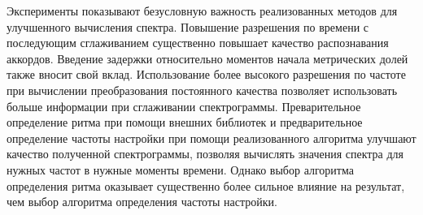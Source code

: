 \medskip

Эксперименты показывают безусловную важность реализованных методов для
улучшенного вычисления спектра. Повышение разрешения по времени с последующим
сглаживанием существенно повышает качество распознавания аккордов. Введение
задержки относительно моментов начала метрических долей также вносит свой вклад.
Использование более высокого разрешения по частоте при вычислении преобразования
постоянного качества позволяет использовать больше информации при сглаживании
спектрограммы. Преварительное определение ритма при помощи внешних библиотек и
предварительное определение частоты настройки при помощи реализованного
алгоритма улучшают качество полученной спектрограммы, позволяя вычислять
значения спектра для нужных частот в нужные моменты времени. Однако выбор
алгоритма определения ритма оказывает существенно более сильное влияние на
результат, чем выбор алгоритма определения частоты настройки.


